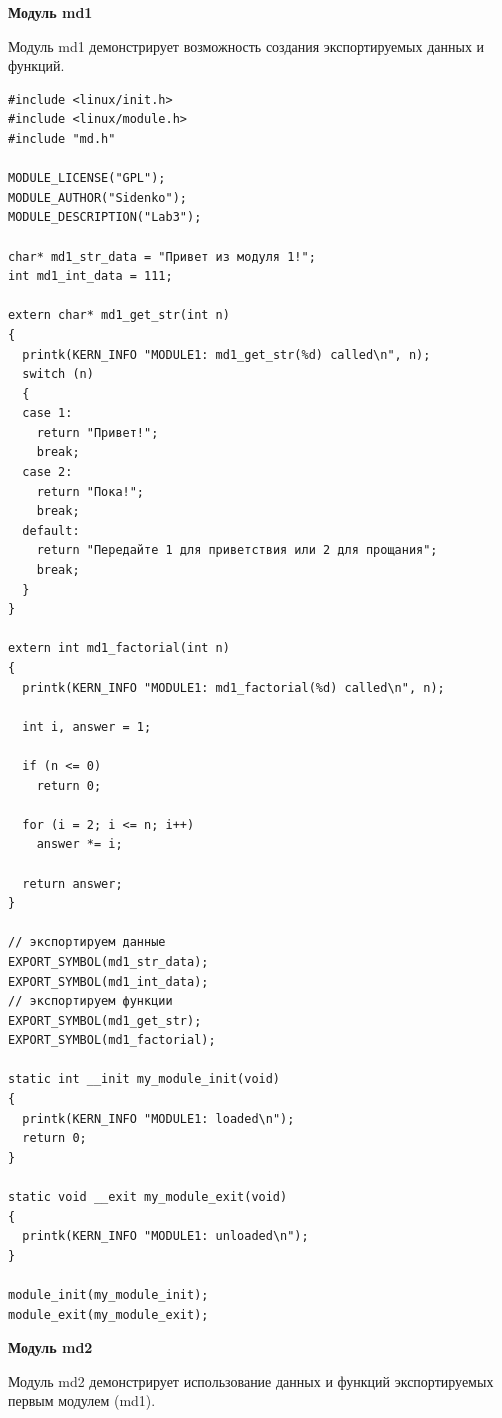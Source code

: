\documentclass[a4paper,14pt]{extreport} %
\begin{document}
\newpage

\textbf{Модуль md1}

Модуль md1 демонстрирует возможность создания экспортируемых данных и функций.

\begin{lstlisting}
#include <linux/init.h>
#include <linux/module.h>
#include "md.h"

MODULE_LICENSE("GPL");
MODULE_AUTHOR("Sidenko");
MODULE_DESCRIPTION("Lab3");

char* md1_str_data = "Привет из модуля 1!";
int md1_int_data = 111;

extern char* md1_get_str(int n)
{
  printk(KERN_INFO "MODULE1: md1_get_str(%d) called\n", n);
  switch (n)
  {
  case 1:
    return "Привет!";
    break;
  case 2:
    return "Пока!";
    break;
  default:
    return "Передайте 1 для приветствия или 2 для прощания";
    break;
  }
}

extern int md1_factorial(int n)
{
  printk(KERN_INFO "MODULE1: md1_factorial(%d) called\n", n);

  int i, answer = 1;

  if (n <= 0)
    return 0;

  for (i = 2; i <= n; i++)
    answer *= i;

  return answer;
}

// экспортируем данные
EXPORT_SYMBOL(md1_str_data);
EXPORT_SYMBOL(md1_int_data);
// экспортируем функции
EXPORT_SYMBOL(md1_get_str);
EXPORT_SYMBOL(md1_factorial);

static int __init my_module_init(void)
{
  printk(KERN_INFO "MODULE1: loaded\n");
  return 0;
}

static void __exit my_module_exit(void)
{
  printk(KERN_INFO "MODULE1: unloaded\n");
}

module_init(my_module_init);
module_exit(my_module_exit);
\end{lstlisting}

\textbf{Модуль md2}

Модуль md2 демонстрирует использование данных и функций экспортируемых первым модулем (md1).
\end{document}
